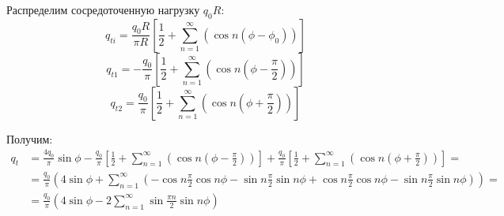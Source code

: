 Распределим сосредоточенную нагрузку $q_0R$:
\begin{equation}
    \label{eq9}
    q_{ti} = \frac{q_0R}{\pi R} \left[ \frac{1}{2} + \sum_{n = 1}^{\infty} \left( \cos n (\phi - \phi_0) \right) \right]
\end{equation}
\begin{equation}
    \label{eq10}
    q_{t1} = -\frac{q_0}{\pi} \left[ \frac{1}{2} + \sum_{n = 1}^{\infty} \left( \cos n (\phi - \frac{\pi}{2}) \right) \right]
\end{equation}
\begin{equation}
    \label{eq11}
    q_{t2} = \frac{q_0}{\pi} \left[ \frac{1}{2} + \sum_{n = 1}^{\infty} \left( \cos n (\phi + \frac{\pi}{2}) \right) \right]
\end{equation}

Получим:
\begin{equation}
    \label{eq12}
    \begin{split}
        q_t & = \frac{4q_0}{\pi} \sin \phi - \frac{q_0}{\pi} \left[ \frac{1}{2} + \sum_{n = 1}^{\infty} \left( \cos n (\phi - \frac{\pi}{2}) \right) \right] + \frac{q_0}{\pi} \left[ \frac{1}{2} + \sum_{n = 1}^{\infty} \left( \cos n (\phi + \frac{\pi}{2}) \right) \right] =
        \\
        & = \frac{q_0}{\pi} \left( 4 \sin \phi + \sum_{n = 1}^{\infty} \left( -\cos n \frac{\pi}{2} \cos n \phi - \sin n \frac{\pi}{2} \sin n \phi + \cos n \frac{\pi}{2} \cos n \phi - \sin n \frac{\pi}{2} \sin n \phi \right) \right) =
        \\
        & = \frac{q_0}{\pi} \left( 4 \sin \phi - 2\sum_{n = 1}^{\infty} \sin\frac{\pi n}{2} \sin n \phi \right)
    \end{split}
\end{equation}

